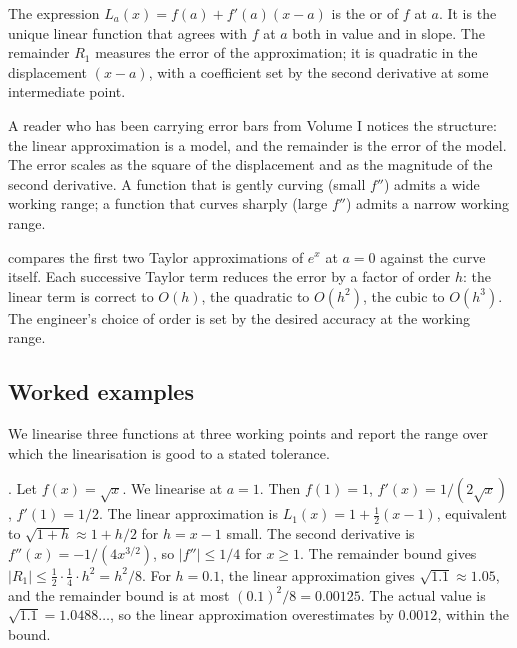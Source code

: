 The expression $L_{a}(x) = f(a) + f'(a)(x - a)$ is the
 or  of $f$ at $a$. It is the unique linear function
that agrees with $f$ at $a$ both in value and in slope. The
remainder $R_{1}$ measures the error of the approximation; it is
quadratic in the displacement $(x - a)$, with a coefficient set
by the second derivative at some intermediate point.

A reader who has been carrying error bars from Volume I notices
the structure: the linear approximation is a model, and the
remainder is the error of the model. The error scales as the
square of the displacement and as the magnitude of the second
derivative. A function that is gently curving (small $f''$) admits
a wide working range; a function that curves sharply (large
$f''$) admits a narrow working range.



 compares the first
two Taylor approximations of $e^{x}$ at $a = 0$ against the curve
itself. Each successive Taylor term reduces the error by a factor
of order $h$: the linear term is correct to $O(h)$, the quadratic
to $O(h^{2})$, the cubic to $O(h^{3})$. The engineer's choice of
order is set by the desired accuracy at the working range.

\subsection{Worked examples}

We linearise three functions at three working points and report
the range over which the linearisation is good to a stated
tolerance.

. Let $f(x) = \sqrt{x}$. We
linearise at $a = 1$. Then $f(1) = 1$, $f'(x) = 1/(2\sqrt{x})$,
$f'(1) = 1/2$. The linear approximation is $L_{1}(x) = 1 +
\tfrac{1}{2}(x - 1)$, equivalent to $\sqrt{1 + h} \approx 1 + h/2$
for $h = x - 1$ small. The second derivative is $f''(x) = -1/(4
x^{3/2})$, so $|f''| \leq 1/4$ for $x \geq 1$. The remainder bound
gives $|R_{1}| \leq \tfrac{1}{2} \cdot \tfrac{1}{4} \cdot h^{2} =
h^{2}/8$. For $h = 0.1$, the linear approximation gives
$\sqrt{1.1} \approx 1.05$, and the remainder bound is at most
$(0.1)^{2}/8 = 0.00125$. The actual value is $\sqrt{1.1} =
1.0488\ldots$, so the linear approximation overestimates by
$0.0012$, within the bound.

